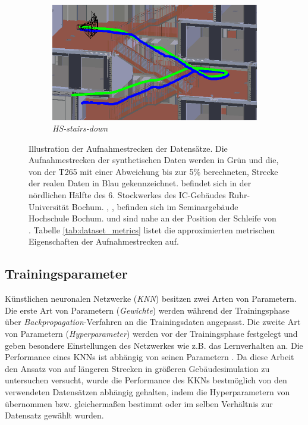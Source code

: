 \begin{figure}
\begin{subfigure}[tl]{0.45\linewidth}
		\flushright		\includegraphics[width=\linewidth]{images/trajectories/hs_down.png}
		\caption{\textit{HS-stairs-down}}
		\label{subfig:traj_hs-down}
	\end{subfigure}
	\hfill
	\caption{Illustration der Aufnahmestrecken der Datensätze. Die Aufnahmestrecken der synthetischen Daten werden in Grün und die, von der T265 mit einer Abweichung bis zur 5\% berechneten, Strecke der realen Daten in Blau gekennzeichnet.  befindet sich in der nördlichen Hälfte des 6. Stockwerkes des IC-Gebäudes Ruhr-Universität Bochum. , ,  befinden sich im Seminargebäude Hochschule Bochum.  und  sind nahe an der Position der Schleife von . Tabelle \ref{tab:dataset_metrics} listet die approximierten metrischen Eigenschaften der Aufnahmestrecken auf.}
	\label{fig:trajectories}
\end{figure}

\subsection{Trainingsparameter}
Künstlichen neuronalen Netzwerke (\textit{KNN}) besitzen zwei Arten von Parametern. Die erste Art von Parametern (\textit{Gewichte}) werden während der Trainingsphase über \textit{Backpropagation}-Verfahren an die Trainingsdaten angepasst.
Die zweite Art von Parametern (\textit{Hyperparameter}) werden vor der Trainingsphase festgelegt und geben besondere Einstellungen des Netzwerkes wie z.B. das Lernverhalten an. Die Performance eines KNNs ist abhängig von seinen Parametern \cite{Goodfellow-et-al-2016}. Da diese Arbeit den Ansatz von \citet{acharyaBIMPoseNetIndoorCamera2019} auf längeren Strecken in größeren Gebäudesimulation zu untersuchen versucht, wurde die Performance des KKNs bestmöglich von den verwendeten Datensätzen abhängig gehalten, indem die Hyperparametern von \citet{acharyaBIMPoseNetIndoorCamera2019} übernommen bzw. gleichermaßen bestimmt oder im selben Verhältnis zur Datensatz gewählt wurden.

